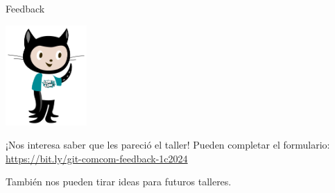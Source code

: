 \begin{frame}{Feedback}

    \begin{center}
        \includegraphics[height=1.5in]{images/octocat-comcom.pdf}
    \end{center}

    \begin{block}{¡Nos interesa saber que les pareció el taller!}
        Pueden completar el formulario: \url{https://bit.ly/git-comcom-feedback-1c2024}

        \vspace{0.5em}

        También nos pueden tirar ideas para futuros talleres.
    \end{block}

\end{frame}
